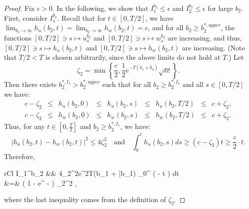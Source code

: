 \documentclass[11pt]{article}
\begin{document}
\begin{proof}
	Fix $\epsilon>0$. In the following, we show that $I_1^{b_2} \leq \epsilon$ and $I_2^{b_2} \leq \epsilon$ for large $b_2$.
	First, consider $I_1^{b_2}$. Recall that for $t \in[0,T/2]$, we have $\lim_{b_2 \to \infty}h_u(b_2,t) = \lim_{b_2 \to \infty}h_w(b_2,t) = c$, and for all $b_2 \geq b_2^{*,upper}$, the functions $[0,T/2] \ni s \mapsto u_s^{b_2}$ and $[0,T/2] \ni s \mapsto w_s^{b_2}$ are increasing, and thus, $[0,T/2] \ni s \mapsto h_u(b_2,t)$ and $[0,T/2] \ni s \mapsto h_w(b_2,t)$ are increasing. (Note that $T/2<T$ is chosen arbitrarily, since the above limits do not hold at $T$.) Let 
	$$ \zeta_2 = \min \left\{ \frac{c}{2},  \frac{1}{2} e^{-T(b_1+\bar{b}_2)} \sqrt{\epsilon c} \right\}.$$
	Then there exists $b_2^{*,I_1}  > b_2^{*,upper}$ such that for all $b_2 \geq b_2^{*,I_1}$ and all $s\in [0, T/2]$ we have:
	\begin{equation*}
	\begin{array}{lclclclcl}
		c - \zeta_2 &\leq& h_u(b_2,0) &\leq& h_u(b_2,s) &\leq& h_u(b_2, T/2 ) &\leq& c + \zeta_2, \\
		c - \zeta_2 &\leq& h_w(b_2,0) &\leq& h_w(b_2,s) &\leq& h_w(b_2, T/2 ) &\leq& c + \zeta_2.
	\end{array}
	\end{equation*}
	Thus, for any $t \in [0,\frac{T}{2}]$ and $b_2 \geq b_2^{*,I_1}$, we have:
	$$
		\vert h_u(b_2, t) - h_w(b_2,t) \vert^2 \leq  4 \zeta_2^2 \quad \text{and} \quad \int_0^t h_u(b_2,s)ds \geq (c - \zeta_2) t \geq \frac{c}{2}\cdot t.
	$$
	Therefore,
	\begin{IEEEeqnarray}{rCl}
		I_1^{b_2} &\leq& 4\zeta_2^2e^{2T(b_1 + \bar{b}_1)} \cdot{} \int_0^{} \exp \left(  -  \cdot {}\cdot t \right) dt \nonumber \\
		&=& \cdot  \left( 1 - e^{ -    } \right) \cdot \zeta_2^2 \leq \epsilon, 
	\label{eq:I1_ineq_b2_infinity}
	\end{IEEEeqnarray}
	where the last inequality comes from the definition of $\zeta_2$.
	

\end{proof}
\end{document}
